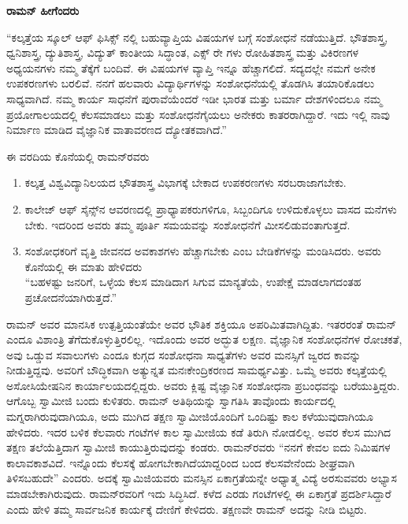 \vskip 2pt

\textbf{ರಾಮನ್ ಹೀಗೆಂದರು\general{\enginline{-}}}

\vskip 2pt

“ಕಲ್ಕತ್ತೆಯ ಸ್ಕೂಲ್ ಆಫ್ ಫಿಸಿಕ್ಸ್ ನಲ್ಲಿ ಬಹುವ್ಯಾಪ್ತಿಯ ವಿಷಯಗಳ ಬಗ್ಗೆ ಸಂಶೋಧನೆ ನಡೆಯುತ್ತಿದೆ. ಭೌತಶಾಸ್ತ್ರ, ಧ್ವನಿಶಾಸ್ತ್ರ, ದ್ಯುತಿಶಾಸ್ತ್ರ, ವಿದ್ಯುತ್ ಕಾಂತೀಯ ಸಿದ್ಧಾಂತ, ಎಕ್ಸ್ ರೇ ಗಳು ರೋಹಿತಶಾಸ್ತ್ರ ಮತ್ತು ವಿಕಿರಣಗಳ ಅಧ್ಯಯನಗಳು ನಮ್ಮ ತೆಕ್ಕೆಗೆ ಬಂದಿವೆ. ಈ ವಿಷಯಗಳ ವ್ಯಾಪ್ತಿ ಇನ್ನೂ ಹೆಚ್ಚಾಗಲಿದೆ. ಸದ್ಯದಲ್ಲೇ ನಮಗೆ ಅನೇಕ ಉಪಕರಣಗಳು ಬರಲಿವೆ. ನನಗೆ ಹಲವಾರು ವಿದ್ಯಾರ್ಥಿಗಳನ್ನು ಸಂಶೋಧನೆಯಲ್ಲಿ ತೊಡಗಿಸಿ ತಯಾರಿಕೊಡಲು ಸಾಧ್ಯವಾಗಿದೆ. ನಮ್ಮ ಕಾರ್ಯ ಸಾಧನೆಗೆ ಪುರಾವೆಯೆಂದರೆ ಇಡೀ ಭಾರತ ಮತ್ತು ಬರ್ಮಾ ದೇಶಗಳಿಂದಲೂ ನಮ್ಮ ಪ್ರಯೋಗಾಲಯದಲ್ಲಿ ಕೆಲಸಮಾಡಲು ಮತ್ತು ಸಂಶೋಧನೆಗೈಯಲು ಅನೇಕರು ಕಾತರರಾಗಿದ್ದಾರೆ. ಇದು ಇಲ್ಲಿ ನಾವು ನಿರ್ಮಾಣ ಮಾಡಿದ ವೈಜ್ಞಾನಿಕ ವಾತಾವರಣದ ದ್ಯೋತಕವಾಗಿದೆ.”

\vskip 3pt

ಈ ವರದಿಯ ಕೊನೆಯಲ್ಲಿ ರಾಮನ್‍ರವರು

\begin{enumerate}
\item ಕಲ್ಕತ್ತ ವಿಶ್ವವಿದ್ಯಾನಿಲಯದ ಭೌತಶಾಸ್ತ್ರ ವಿಭಾಗಕ್ಕೆ ಬೇಕಾದ ಉಪಕರಣಗಳು ಸರಬರಾಜಾಗ\-ಬೇಕು. 

 \item ಕಾಲೇಜ್ ಆಫ್ ಸೈನ್ಸ್‌ನ ಆವರಣದಲ್ಲಿ ಪ್ರಾಧ್ಯಾಪಕರುಗಳಿಗೂ, ಸಿಬ್ಬಂದಿಗೂ ಉಳಿದುಕೊಳ್ಳಲು ವಾಸದ ಮನೆಗಳು ಬೇಕು. ಇದರಿಂದ ಅವರು ತಮ್ಮ ಪೂರ್ತಿ ಸಮಯವನ್ನು ಸಂಶೋಧನೆಗೆ ಮೀಸಲಿಡುವಂತಾಗುತ್ತದೆ.

 \item ಸಂಶೋಧಕರಿಗೆ ವೃತ್ತಿ ಜೀವನದ ಅವಕಾಶಗಳು ಹೆಚ್ಚಾಗಬೇಕು ಎಂಬ ಬೇಡಿಕೆಗಳನ್ನು ಮಂಡಿಸಿ\-ದರು. ಅವರು ಕೊನೆಯಲ್ಲಿ ಈ ಮಾತು ಹೇಳಿದರು\enginline{-} \\“ಬಹಳಷ್ಟು ಜನರಿಗೆ, ಒಳ್ಳೆಯ ಕೆಲಸ ಮಾಡಿದಾಗ ಸಿಗುವ ಮಾನ್ಯತೆಯೆ, ಉಪೇಕ್ಷೆ ಮಾಡಲಾಗದಂತಹ ಪ್ರಚೋದನೆಯಾಗಿರುತ್ತದೆ.”

\end{enumerate}

\vskip 3pt

ರಾಮನ್ ಅವರ ಮಾನಸಿಕ ಉತ್ಪತ್ತಿಯಂತೆಯೇ ಅವರ ಭೌತಿಕ ಶಕ್ತಿಯೂ ಅಪರಿಮಿತವಾಗಿದ್ದಿತು. ಇತರರಂತೆ ರಾಮನ್ ಎಂದೂ ವಿಶಾಂತ್ರಿ ತೆಗೆದುಕೊಳ್ಳುತ್ತಿರಲಿಲ್ಲ. ಇದೊಂದು ಅವರ ಅದ್ಭುತ ಲಕ್ಷಣ. ವೈಜ್ಞಾನಿಕ ಸಂಶೋಧನೆಗಳ ರೋಚಕತೆ, ಅವು ಒಡ್ಡುವ ಸವಾಲುಗಳು ಎಂದೂ ಕುಗ್ಗದ ಸಂಶೋಧನಾ ಸಾಧ್ಯತೆಗಳು ಅವರ ಮನಸ್ಸಿಗೆ ಜ್ವರದ ಕಾವನ್ನು ನೀಡುತ್ತಿದ್ದವು. ಅವರಿಗೆ ಬೌದ್ಧಿಕವಾಗಿ ಅತ್ಯುನ್ನತ ಮನಃಕೇಂದ್ರಿಕರಣದ ಸಾಮರ್ಥ್ಯವಿತ್ತು. ಒಮ್ಮೆ ಅವರು ಕಲ್ಕತ್ತೆಯಲ್ಲಿ ಅಸೋಸಿಯೇಷನಿನ ಕಾರ್ಯಾಲಯದಲ್ಲಿದ್ದರು. ಅವರು ಕ್ಲಿಷ್ಟ ವೈಜ್ಞಾನಿಕ ಸಂಶೋಧನಾ ಪ್ರಬಂಧವನ್ನು ಬರೆಯುತ್ತಿದ್ದರು. ಆಗೊಬ್ಬ ಸ್ವಾಮೀಜಿ ಬಂದು ಕುಳಿತರು. ರಾಮನ್ ಅತಿಥಿಯನ್ನು ಸ್ವಾಗತಿಸಿ ತಾವೊಂದು ಕಾರ್ಯದಲ್ಲಿ ಮಗ್ನರಾಗಿರುವುದಾಗಿಯೂ, ಅದು ಮುಗಿದ ತಕ್ಷಣ ಸ್ವಾಮೀಜಿಯೊಂದಿಗೆ ಒಂದಿಷ್ಟು ಕಾಲ ಕಳೆಯುವು\-ದಾಗಿಯೂ ಹೇಳಿದರು. ಇದರ ಬಳಿಕ ಕೆಲವಾರು ಗಂಟೆಗಳ ಕಾಲ ಸ್ವಾಮೀಜಿಯ ಕಡೆ ತಿರುಗಿ ನೋಡಲಿಲ್ಲ. ಅವರ ಕೆಲಸ ಮುಗಿದ ತಕ್ಷಣ ತಲೆಯೆತ್ತಿದಾಗ ಸ್ವಾಮೀಜಿ ಕಾಯುತ್ತಿರುವುದನ್ನು ಕಂಡರು. ರಾಮನ್‍ರವರು “ನನಗೆ ಕೇವಲ ಐದು ನಿಮಿಷಗಳ ಕಾಲಾವಕಾಶವಿದೆ. ಇನ್ನೊಂದು ಕೆಲಸಕ್ಕೆ ಹೋಗಬೇಕಾಗಿದೆಯಾದ್ದರಿಂದ ಬಂದ ಕೆಲಸವೇನೆಂದು ಶೀಘ್ರವಾಗಿ ತಿಳಿಸಬಹುದೇ” ಎಂದರು. ಅದಕ್ಕೆ ಸ್ವಾಮಿಜಿಯವರು ಮನಸ್ಸಿನ ಏಕಾಗ್ರತೆಯನ್ನೇ ಅಧ್ಯಾತ್ಮ ವಿದ್ಯೆ ಅರಸುವವರು ಅಭ್ಯಾಸ ಮಾಡಬೇಕಾಗಿರುವುದು. ರಾಮನ್‍ರವರಿಗೆ ಇದು ಸಿದ್ಧಿಸಿದೆ. ಕಳೆದ ಎರಡು ಗಂಟೆಗಳಲ್ಲಿ ಈ ಏಕಾಗ್ರತೆ ಪ್ರದರ್ಶಿಸಿದ್ದಾರೆ ಎಂದು ಹೇಳಿ ತಮ್ಮ ಸಾರ್ವಜನಿಕ ಕಾರ್ಯಕ್ಕೆ ದೇಣಿಗೆ ಕೇಳಿದರು. ತಕ್ಷಣವೇ ರಾಮನ್ ಅದನ್ನು ನೀಡಿ ಬಿಟ್ಟರು.

